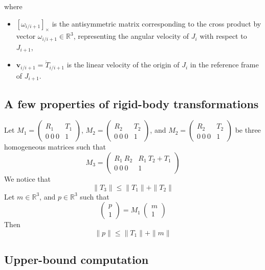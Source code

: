 \documentclass {article}
\newcommand\linvel{\textbf{v}}
\newcommand\reals{\mathbb{R}}
\newcommand\crossprod[1]{\left[#1\right]_{\times}}
\begin{document}
where
\begin{itemize}
\item $\crossprod{\omega_{i/i+1}}$ is the antisymmetric matrix
  corresponding to the cross product by vector
  $\omega_{i/i+1}\in\reals^3$, representing the angular velocity of
  $J_i$ with respect to $J_{i+1}$,
\item $\linvel_{i/i+1} = \dot{T}_{i/i+1}$ is the linear velocity of the origin of
$J_i$ in the reference frame of $J_{i+1}$.
\end{itemize}

\subsection {A few properties of rigid-body transformations}

Let $M_1=\left(\begin{array}{cc}R_1 & T_1\\0\ 0\ 0 & 1\end{array}\right)$,
$M_2=\left(\begin{array}{cc}R_2 & T_2\\0\ 0\ 0 & 1\end{array}\right)$, and
$M_2=\left(\begin{array}{cc}R_2 & T_2\\0\ 0\ 0 & 1\end{array}\right)$ be three homogeneous matrices such that
$$
M_3 = \left(\begin{array}{cc}R_1\ R_2 & R_1\ T_2 + T_1\\0\ 0\ 0 & 1\end{array}\right)
$$
We notice that
\begin{equation}\label{eq:ineq1}
\|T_3\| \leq \|T_1\| + \|T_2\|
\end{equation}
Let $m\in\reals^3$, and $p\in\reals^3$ such that
$$
\left(\begin{array}{c}p\\1\end{array}\right) = M_1\ \left(\begin{array}{c}m\\1\end{array}\right)
$$
Then
\begin{equation}\label{eq:ineq2}
\|p\| \leq \|T_1\| + \|m\|
\end{equation}

\subsection {Upper-bound computation}
\end{document}
